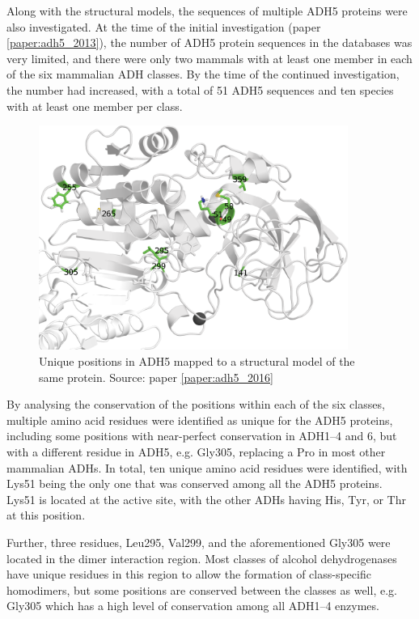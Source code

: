 \documentclass[a4paper, twoside, 12pt, openright]{report}
\begin{document}
Along with the structural models, the sequences of multiple ADH5 proteins were also investigated. At the time of the initial investigation (paper \ref{paper:adh5_2013}), the number of ADH5 protein sequences in the databases was very limited, and there were only two mammals with at least one member in each of the six mammalian ADH classes. By the time of the continued investigation, the number had increased, with a total of 51 ADH5 sequences and ten species with at least one member per class.

\begin{figure}[p]
 \includegraphics[width=0.9\textwidth]{fig/adh5_uniq_pos.png}
 \caption{Unique positions in ADH5 mapped to a structural model of the same protein. Source: paper \ref{paper:adh5_2016}}
 \label{fig:adh5_uniq_struct}
\end{figure}	

By analysing the conservation of the positions within each of the six classes, multiple amino acid residues were identified as unique for the ADH5 proteins, including some positions with near-perfect conservation in ADH1--4 and 6, but with a different residue in ADH5, e.g. Gly305, replacing a Pro in most other mammalian ADHs. In total, ten unique amino acid residues were identified, with Lys51 being the only one that was conserved among all the ADH5 proteins. Lys51 is located at the active site, with the other ADHs having His, Tyr, or Thr at this position\cite{hoog_mammalian_2001-1}.

Further, three residues, Leu295, Val299, and the aforementioned Gly305 were located in the dimer interaction region. Most classes of alcohol dehydrogenases have unique residues in this region to allow the formation of class-specific homodimers, but some positions are conserved between the classes as well, e.g. Gly305 which has a high level of conservation among all ADH1--4 enzymes.
\end{document}
